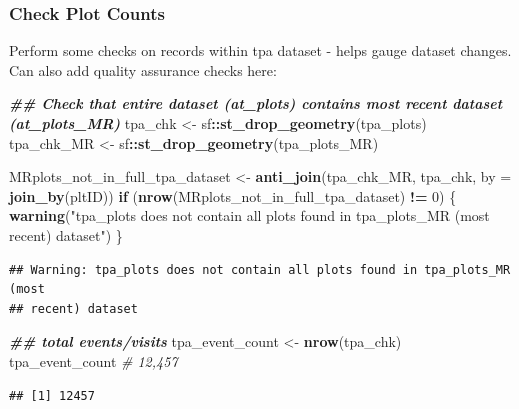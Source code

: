 \documentclass[
]{book}
\newenvironment{Shaded}{\begin{snugshade}}{\end{snugshade}}
\newcommand{\AttributeTok}[1]{\textcolor[rgb]{0.13,0.29,0.53}{#1}}
\newcommand{\CommentTok}[1]{\textcolor[rgb]{0.56,0.35,0.01}{\textit{#1}}}
\newcommand{\ControlFlowTok}[1]{\textcolor[rgb]{0.13,0.29,0.53}{\textbf{#1}}}
\newcommand{\DecValTok}[1]{\textcolor[rgb]{0.00,0.00,0.81}{#1}}
\newcommand{\DocumentationTok}[1]{\textcolor[rgb]{0.56,0.35,0.01}{\textbf{\textit{#1}}}}
\newcommand{\FunctionTok}[1]{\textcolor[rgb]{0.13,0.29,0.53}{\textbf{#1}}}
\newcommand{\NormalTok}[1]{#1}
\newcommand{\OtherTok}[1]{\textcolor[rgb]{0.56,0.35,0.01}{#1}}
\newcommand{\SpecialCharTok}[1]{\textcolor[rgb]{0.81,0.36,0.00}{\textbf{#1}}}
\newcommand{\StringTok}[1]{\textcolor[rgb]{0.31,0.60,0.02}{#1}}
\begin{document}
\hypertarget{check-plot-counts}{%
\subsubsection{Check Plot Counts}\label{check-plot-counts}}

Perform some checks on records within tpa dataset - helps gauge dataset changes. Can also add quality assurance checks here:

\begin{Shaded}
\begin{Highlighting}[]
\DocumentationTok{\#\# Check that entire dataset (at\_plots) contains most recent dataset (at\_plots\_MR) }
\NormalTok{tpa\_chk }\OtherTok{\textless{}{-}}\NormalTok{ sf}\SpecialCharTok{::}\FunctionTok{st\_drop\_geometry}\NormalTok{(tpa\_plots)}
\NormalTok{tpa\_chk\_MR }\OtherTok{\textless{}{-}}\NormalTok{ sf}\SpecialCharTok{::}\FunctionTok{st\_drop\_geometry}\NormalTok{(tpa\_plots\_MR)}

\NormalTok{MRplots\_not\_in\_full\_tpa\_dataset }\OtherTok{\textless{}{-}} \FunctionTok{anti\_join}\NormalTok{(tpa\_chk\_MR, tpa\_chk, }\AttributeTok{by =} \FunctionTok{join\_by}\NormalTok{(pltID))}
\ControlFlowTok{if}\NormalTok{ (}\FunctionTok{nrow}\NormalTok{(MRplots\_not\_in\_full\_tpa\_dataset) }\SpecialCharTok{!=} \DecValTok{0}\NormalTok{) \{}
  \FunctionTok{warning}\NormalTok{(}\StringTok{"tpa\_plots does not contain all plots found in tpa\_plots\_MR (most recent) dataset"}\NormalTok{)}
\NormalTok{\}}
\end{Highlighting}
\end{Shaded}

\begin{verbatim}
## Warning: tpa_plots does not contain all plots found in tpa_plots_MR (most
## recent) dataset
\end{verbatim}

\begin{Shaded}
\begin{Highlighting}[]
\DocumentationTok{\#\# total events/visits}
\NormalTok{tpa\_event\_count }\OtherTok{\textless{}{-}} \FunctionTok{nrow}\NormalTok{(tpa\_chk) }
\NormalTok{tpa\_event\_count }\CommentTok{\# 12,457}
\end{Highlighting}
\end{Shaded}

\begin{verbatim}
## [1] 12457
\end{verbatim}

\begin{Shaded}
\end{Shaded}
\end{document}
